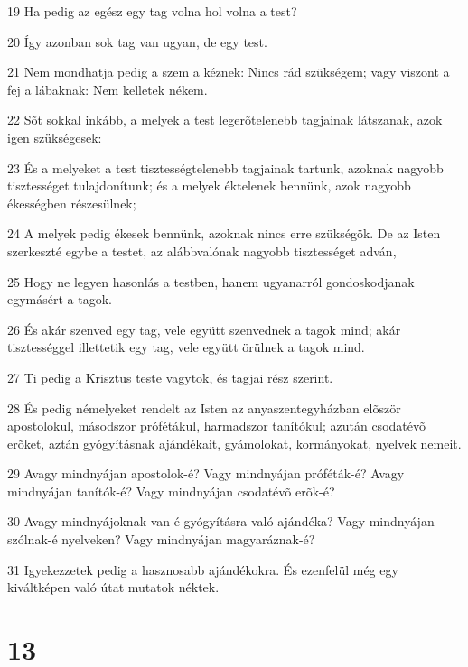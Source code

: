 \par 19 Ha pedig az egész egy tag volna hol volna a test?
\par 20 Így azonban sok tag van ugyan, de egy test.
\par 21 Nem mondhatja pedig a szem a kéznek: Nincs rád szükségem; vagy viszont a fej a lábaknak: Nem kelletek nékem.
\par 22 Sõt sokkal inkább, a melyek a test legerõtelenebb tagjainak látszanak, azok igen szükségesek:
\par 23 És a melyeket a test tisztességtelenebb tagjainak tartunk, azoknak nagyobb tisztességet tulajdonítunk; és a melyek éktelenek bennünk, azok nagyobb ékességben részesülnek;
\par 24 A melyek pedig ékesek bennünk, azoknak nincs erre szükségök. De az Isten szerkeszté egybe a testet, az alábbvalónak nagyobb tisztességet adván,
\par 25 Hogy ne legyen hasonlás a testben, hanem ugyanarról gondoskodjanak egymásért a tagok.
\par 26 És akár szenved egy tag, vele együtt szenvednek a tagok mind; akár tisztességgel illettetik egy tag, vele együtt örülnek a tagok mind.
\par 27 Ti pedig a Krisztus teste vagytok, és tagjai rész szerint.
\par 28 És pedig némelyeket rendelt az Isten az anyaszentegyházban elõször apostolokul, másodszor prófétákul, harmadszor tanítókul; azután csodatévõ erõket, aztán gyógyításnak ajándékait, gyámolokat, kormányokat, nyelvek nemeit.
\par 29 Avagy mindnyájan apostolok-é? Vagy mindnyájan próféták-é? Avagy mindnyájan tanítók-é? Vagy mindnyájan csodatévõ erõk-é?
\par 30 Avagy mindnyájoknak van-é gyógyításra való ajándéka? Vagy mindnyájan szólnak-é nyelveken? Vagy mindnyájan magyaráznak-é?
\par 31 Igyekezzetek pedig a hasznosabb ajándékokra. És ezenfelül még egy kiváltképen való útat mutatok néktek.

\chapter{13}

